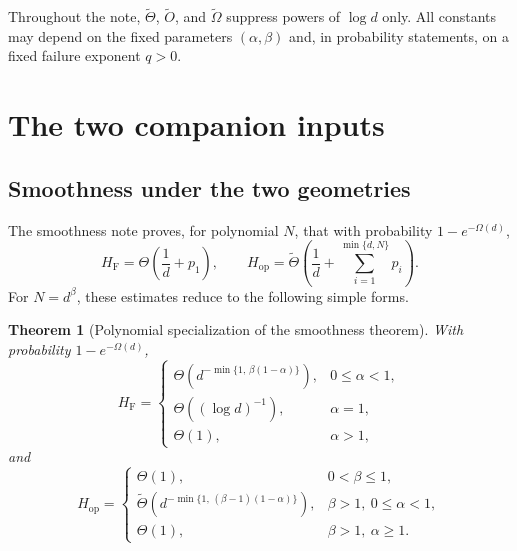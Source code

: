 \documentclass[11pt]{article}
\newtheorem{theorem}{Theorem}[section]
\newcommand{\HF}{H_{\mathrm F}}
\newcommand{\Hop}{H_{\mathrm{op}}}
\begin{document}
Throughout the note, $\widetilde\Theta$, $\widetilde O$, and
$\widetilde\Omega$ suppress powers of $\log d$ only.  All constants may
depend on the fixed parameters $(\alpha,\beta)$ and, in probability
statements, on a fixed failure exponent $q>0$.

\section{The two companion inputs}

\subsection{Smoothness under the two geometries}

The smoothness note proves, for polynomial $N$, that with probability
$1-e^{-\Omega(d)}$,
\begin{equation}
 \HF=\Theta\!\left(\frac1d+p_1\right),
 \qquad
 \Hop=\widetilde\Theta\!\left(
 \frac1d+\sum_{i=1}^{\min\{d,N\}}p_i
 \right).
 \label{eq:base-smoothness}
\end{equation}
For $N=d^\beta$, these estimates reduce to the following simple forms.

\begin{theorem}[Polynomial specialization of the smoothness theorem]
\label{thm:smoothness}
With probability $1-e^{-\Omega(d)}$,
\begin{equation}
 \HF=
 \begin{cases}
 \Theta\!\left(d^{-\min\{1,\,\beta(1-\alpha)\}}\right),
     &0\leq\alpha<1,\\[1mm]
 \Theta\!\left((\log d)^{-1}\right),&\alpha=1,\\[1mm]
 \Theta(1),&\alpha>1,
 \end{cases}
 \label{eq:HF-specialized}
\end{equation}
and
\begin{equation}
 \Hop=
 \begin{cases}
 \Theta(1),&0<\beta\leq1,\\[1mm]
 \widetilde\Theta\!\left(
 d^{-\min\{1,\,(\beta-1)(1-\alpha)\}}
 \right),&\beta>1,\ 0\leq\alpha<1,\\[1mm]
 \Theta(1),&\beta>1,\ \alpha\geq1.
 \end{cases}
 \label{eq:Hop-specialized}
\end{equation}
\end{theorem}
\end{document}

